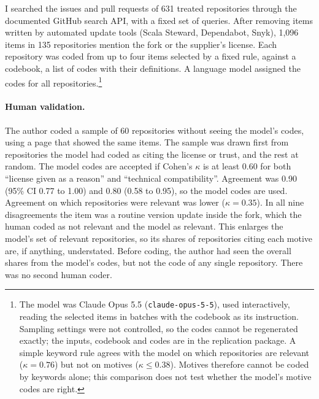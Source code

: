 \documentclass[11pt]{article}
\begin{document}
I searched the issues and pull requests of 631 treated repositories through the documented GitHub search API, with a fixed set of queries. After removing items written by automated update tools (Scala Steward, Dependabot, Snyk), 1,096 items in 135 repositories mention the fork or the supplier's license. Each repository was coded from up to four items selected by a fixed rule, against a codebook, a list of codes with their definitions. A language model assigned the codes for all repositories.\footnote{The model was Claude Opus 5.5 (\texttt{claude-opus-5-5}), used interactively, reading the selected items in batches with the codebook as its instruction. Sampling settings were not controlled, so the codes cannot be regenerated exactly; the inputs, codebook and codes are in the replication package. A simple keyword rule agrees with the model on which repositories are relevant ($\kappa=0.76$) but not on motives ($\kappa\le0.38$). Motives therefore cannot be coded by keywords alone; this comparison does not test whether the model's motive codes are right.}

\paragraph{Human validation.} The author coded a sample of 60 repositories without seeing the model's codes, using a page that showed the same items. The sample was drawn first from repositories the model had coded as citing the license or trust, and the rest at random. The model codes are accepted if Cohen's $\kappa$ is at least 0.60 for both ``license given as a reason'' and ``technical compatibility''. Agreement was 0.90 (95\% CI 0.77 to 1.00) and 0.80 (0.58 to 0.95), so the model codes are used. Agreement on which repositories were relevant was lower ($\kappa=0.35$). In all nine disagreements the item was a routine version update inside the fork, which the human coded as not relevant and the model as relevant. This enlarges the model's set of relevant repositories, so its shares of repositories citing each motive are, if anything, understated. Before coding, the author had seen the overall shares from the model's codes, but not the code of any single repository. There was no second human coder.
\end{document}
